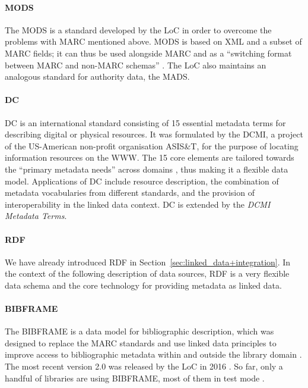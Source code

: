 \paragraph{MODS}

The \gls{MODS} is a standard developed by the \gls{LoC}
in order to overcome the problems with \gls{MARC} mentioned above.
MODS is based on \gls{XML} and a subset of MARC fields;
it can thus be used alongside MARC and as a \enquote{switching format
between MARC and non-MARC schemas} \autocite[p.219]{Hider2008}.
The LoC also maintains an analogous standard for authority data,
the \gls{MADS}.

\paragraph{DC}

\gls{DC} is an international standard consisting of 15 essential metadata terms
for describing digital or physical resources.
It was formulated by the \gls{DCMI}, a project of the US-American non-profit organisation
ASIS\&T, for the purpose of locating information resources on the \gls{WWW}.
The 15 core elements are tailored towards the \enquote{primary metadata needs} across domains
\autocite[p.215]{Hider2008}, thus making it a flexible data model.
Applications of \gls{DC} include resource description,
the combination of metadata vocabularies from different standards,
and the provision of interoperability in the linked data context.
\gls{DC} is extended by the \emph{DCMI Metadata Terms}.


\paragraph{RDF}

We have already introduced \gls{RDF} in Section~\ref{sec:linked_data+integration}.
In the context of the following description of data sources,
RDF is a very flexible data schema and the core technology for providing metadata as linked data.

\paragraph{BIBFRAME}

The \gls{BIBFRAME} is a data model for bibliographic description,
which was designed to replace the \gls{MARC} standards and use linked data principles
to improve access to bibliographic metadata within and outside the library domain \autocite{WikiBIBFRAME}.
The most recent version 2.0 was released by the \gls{LoC} in 2016 \autocite{BIBFRAME}.
So far, only a handful of libraries are using BIBFRAME,
most of them in test mode \autocite{WikiBIBFRAME}.

